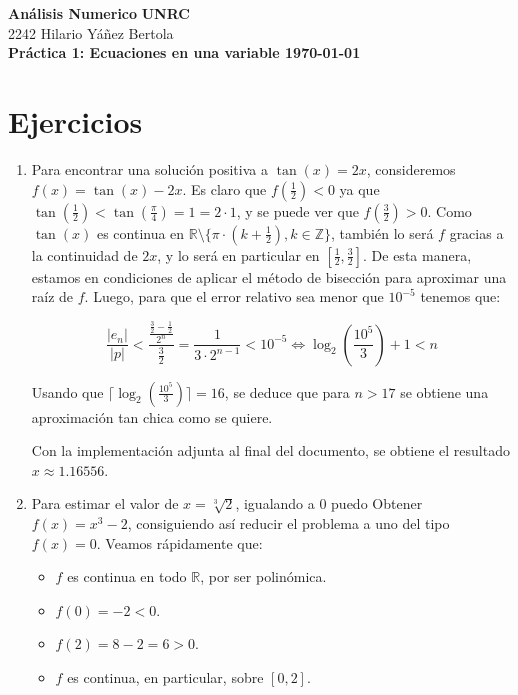 \documentclass[DIN, pagenumber=false, fontsize=11pt, parskip=half]{scrartcl}
\newcommand{\mytitle}[1]{{\noindent\Large\textbf{#1}}}
\begin{document}
\noindent\textbf{Análisis Numerico} \hfill \textbf{UNRC}\\
2242 \hfill Hilario Yáñez Bertola\\

\mytitle{Práctica 1: Ecuaciones en una variable \hfill \small{\today}}

\section{Ejercicios}

\begin{enumerate}

    \item Para encontrar una solución positiva a $\tan (x) = 2x$, consideremos $f(x) = \tan (x) - 2x$.
    Es claro que $f(\frac{1}{2})<0$ ya que $\tan (\frac{1}{2}) < \tan (\frac{\pi}{4}) = 1 = 2 \cdot 1$,
    y se puede ver que $f(\frac{3}{2}) > 0$. Como $\tan (x)$ es continua en $\mathbb{R} \setminus \bigl\{ \pi \cdot (k + \frac{1}{2}), k \in \mathbb{Z} \bigr\}$,
    también lo será $f$ gracias a la continuidad de $2x$, y lo será en particular en $[\frac{1}{2}, \frac{3}{2}]$.
    De esta manera, estamos en condiciones de aplicar el método de bisección para aproximar una raíz de $f$.
    Luego, para que el error relativo sea menor que $10^{-5}$ tenemos que:

    \[ \frac{|e_n|}{|p|} < \frac{\frac{\frac{3}{2} - \frac{1}{2}}{2^n}}{\frac{3}{2}}
    = \frac{1}{3 \cdot 2^{n-1}} < 10^{-5} \iff \log_2 (\frac{10^5}{3}) + 1 < n \]

    Usando que $\lceil \log_2(\frac{10^5}{3}) \rceil = 16$, se deduce que para $n > 17$ se
    obtiene una aproximación tan chica como se quiere.

    Con la implementación adjunta al final del documento, se obtiene el resultado $x \approx 1.16556$.

    \item Para estimar el valor de $x = \sqrt[3]{2}$, igualando a $0$ puedo
    Obtener $f(x) = x^3 - 2$, consiguiendo así reducir el problema a uno del tipo $f(x) = 0$.
    Veamos rápidamente que:

    \begin{itemize}
        \item $f$ es continua en todo $\mathbb{R}$, por ser polinómica.
        \item $f(0) = -2 < 0$.
        \item $f(2) = 8 - 2 = 6 > 0$.
        \item $f$ es continua, en particular, sobre $[0,2]$.
    \end{itemize}


\end{enumerate}
\end{document}

